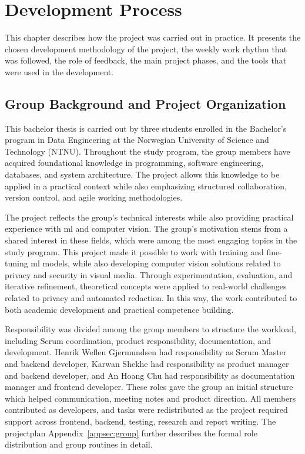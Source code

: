 \chapter{Development Process}
\label{chap:devprocess}

This chapter describes how the project was carried out in practice. It presents the chosen development methodology of the project, the weekly work rhythm that was followed, the role of feedback, the main project phases, and the tools that were used in the development.


\section{Group Background and Project Organization}
\label{sec:group-background-and-project-organization}

This bachelor thesis is carried out by three students enrolled in the Bachelor’s program in Data Engineering at the Norwegian University of Science and Technology (NTNU). Throughout the study program, the group members have acquired foundational knowledge in programming, software engineering, databases, and system architecture. The project allows this knowledge to be applied in a practical context while also emphasizing structured collaboration, version control, and agile working methodologies.

The project reflects the group’s technical interests while also providing practical experience with \acrshort{ml} and computer vision. The group’s motivation stems from a shared interest in these fields, which were among the most engaging topics in the study program. This project made it possible to work with training and fine-tuning \acrshort{ml} models, while also developing computer vision solutions related to privacy and security in visual media. Through experimentation, evaluation, and iterative refinement, theoretical concepts were applied to real-world challenges related to privacy and automated redaction. In this way, the work contributed to both academic development and practical competence building.

Responsibility was divided among the group members to structure the workload, including Scrum coordination, product responsibility, documentation, and development. Henrik Weflen Gjermundsen had responsibility as Scrum Master and backend developer, Karwan Shekhe had responsibility as product manager and backend developer, and An Hoang Chu had responsibility as documentation manager and frontend developer. These roles gave the group an initial structure which helped communication, meeting notes and product direction. All members contributed as developers, and tasks were redistributed as the project required support across frontend, backend, testing, research and report writing. The projectplan Appendix~\ref{appsec:group} further describes the formal role distribution and group routines in detail.




